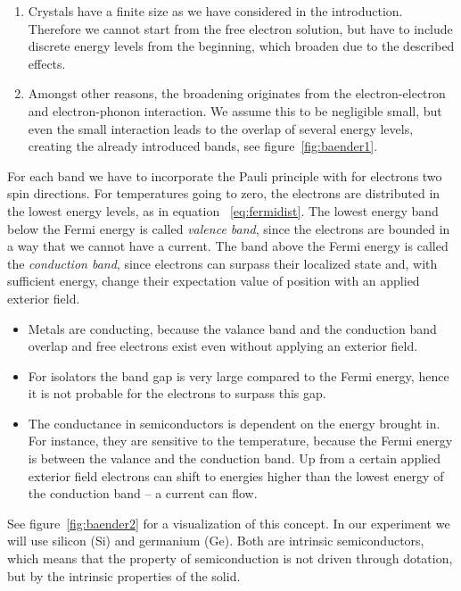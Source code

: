 \begin{enumerate}
    \item Crystals have a finite size as we have considered in the introduction. Therefore
        we cannot start from the free electron solution, but have to include discrete energy 
        levels from the beginning, which broaden due to the described effects.
    \item Amongst other reasons, the broadening originates from the electron-electron and 
        electron-phonon interaction. We assume this to be negligible small, but even
        the small interaction leads to the overlap of several energy levels, creating
        the already introduced bands, see figure~\ref{fig:baender1}.
\end{enumerate}
For each band we have to incorporate the Pauli principle with for electrons two spin directions.
For temperatures going to zero, the electrons are distributed in the lowest energy levels, as in
equation ~\ref{eq:fermidist}. The lowest energy band below the Fermi energy is called
\emph{valence band}, since the electrons are bounded in a way that we cannot have a current.
The band above the Fermi energy is called the \emph{conduction band}, since electrons can surpass their
localized state and, with sufficient energy, change their expectation value of position with an applied
exterior field.
\begin{itemize}
    \item Metals are conducting, because the valance band and the conduction band overlap and 
        free electrons exist even without applying an exterior field.
    \item For isolators the band gap is very large compared to the Fermi energy, hence it is not probable for
        the electrons to surpass this gap.
    \item The conductance in semiconductors is dependent on the energy brought in. For instance, they
        are sensitive to the temperature, because the Fermi energy is between the valance and the
        conduction band. Up from a certain applied exterior field electrons can shift to energies
        higher than the lowest energy of the conduction band -- a current can flow.
\end{itemize}

See figure~\ref{fig:baender2} \cite{demtroder2000experimentalphysik} for
a visualization of this concept.
In our experiment we will use silicon (Si) and germanium (Ge). 
Both are intrinsic semiconductors, which means that the property of semiconduction is not 
driven through dotation, but by the intrinsic properties of the solid.
